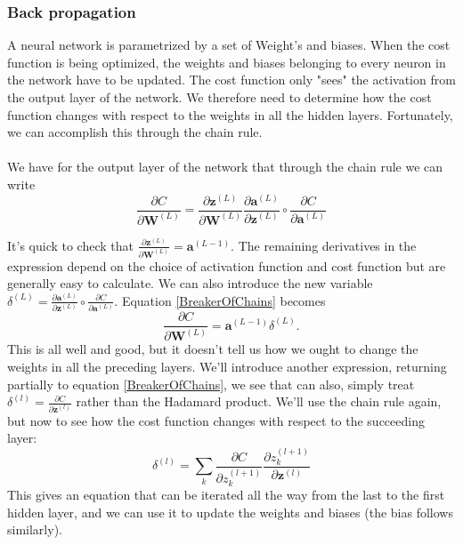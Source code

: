 \documentclass[11pt,a4paper,titlepage]{article}
\begin{document}
\subsubsection{Back propagation}
A neural network is parametrized by a set of Weight's and biases. When the cost function is being optimized, the weights and biases belonging to every neuron in the network have to be updated. The cost function only "sees" the activation from the output layer of the network. We therefore need to determine how the cost function changes with respect to the weights in all the hidden layers. Fortunately, we can accomplish this through the chain rule.\\\\ We have for the output layer of the network that through the chain rule we can write
\begin{equation}\label{BreakerOfChains}
\frac{\partial C}{\partial \textbf{W}^{(L)}} = \frac{\partial \textbf{z}^{(L)}}{\partial \textbf{W}^{(L)}}\frac{\partial \textbf{a}^{(L)}}{\partial \textbf{z}^{(L)}}\circ \frac{\partial C}{\partial \textbf{a}^{(L)}}
\end{equation}

It's quick to check that $\frac{\partial \textbf{z}^{(L)}}{\partial \textbf{W}^{(L)}} = \textbf{a}^{(L-1)}$. The remaining derivatives in the expression depend on the choice of activation function and cost function but are generally easy to calculate. We can also introduce the new variable $\delta^{(L)} = \frac{\partial \textbf{a}^{(L)}}{\partial \textbf{z}^{(L)}}\circ
\frac{\partial C}{\partial \textbf{a}^{(L)}}$. Equation \eqref{BreakerOfChains} becomes 
\begin{equation}
\frac{\partial C}{\partial \textbf{W}^{(L)}} = \textbf{a}^{(L-1)}\delta^{(L)}.
\end{equation}
This is all well and good, but it doesn't tell us how we ought to change the weights in all the preceding layers. We'll introduce another expression, returning partially to equation \eqref{BreakerOfChains}, we see that can also, simply treat $\delta^{(l)} = \frac{\partial C}{\partial \textbf{z}^{(l)}}$ rather than the Hadamard product. We'll use the chain rule again, but now to see how the cost function changes with respect to the succeeding layer:
\begin{equation}
\delta^{(l)} =\sum_k \frac{\partial C}{\partial z_k^{(l+1)}}\frac{\partial z_k^{(l+1)}}{\partial \textbf{z}^{(l)}}
\end{equation}
This gives an equation that can be iterated all the way from the last to the first hidden layer, and we can use it to update the weights and biases (the bias follows similarly). 
\end{document}

